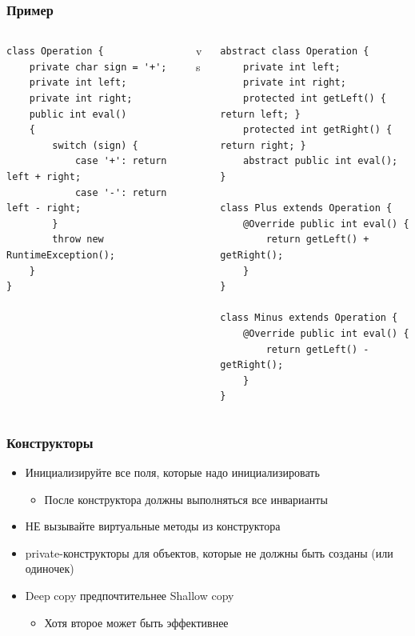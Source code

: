 \documentclass[xetex,mathserif,serif]{beamer}
\begin{document}
    \begin{frame}[fragile]
        \frametitle{Пример}
        \begin{footnotesize}
            \begin{columns}
                \begin{column}{0.35\textwidth}
                    \begin{verbatim}
class Operation {
    private char sign = '+';
    private int left;
    private int right;
    public int eval()
    {
        switch (sign) {
            case '+': return left + right;
            case '-': return left - right;
        }
        throw new RuntimeException();
    }
}
                    \end{verbatim}
                \end{column}
                \begin{column}{0.1\textwidth}
                    vs
                \end{column}
                \begin{column}{0.45\textwidth}
                    \begin{verbatim}
abstract class Operation {
    private int left;
    private int right;
    protected int getLeft() { return left; }
    protected int getRight() { return right; }
    abstract public int eval();
}

class Plus extends Operation {
    @Override public int eval() { 
        return getLeft() + getRight(); 
    }
}

class Minus extends Operation {
    @Override public int eval() { 
        return getLeft() - getRight(); 
    }
}
                    \end{verbatim}
                \end{column}
            \end{columns}
        \end{footnotesize}
    \end{frame}

    \begin{frame}
        \frametitle{Конструкторы}
        \begin{itemize}
            \item Инициализируйте все поля, которые надо инициализировать
            \begin{itemize}
                \item После конструктора должны выполняться все инварианты
            \end{itemize}
            \item НЕ вызывайте виртуальные методы из конструктора
            \item private-конструкторы для объектов, которые не должны быть созданы (или одиночек)
            \item Deep copy предпочтительнее Shallow copy
            \begin{itemize}
                \item Хотя второе может быть эффективнее
            \end{itemize}
        \end{itemize}
    \end{frame}
\end{document}
